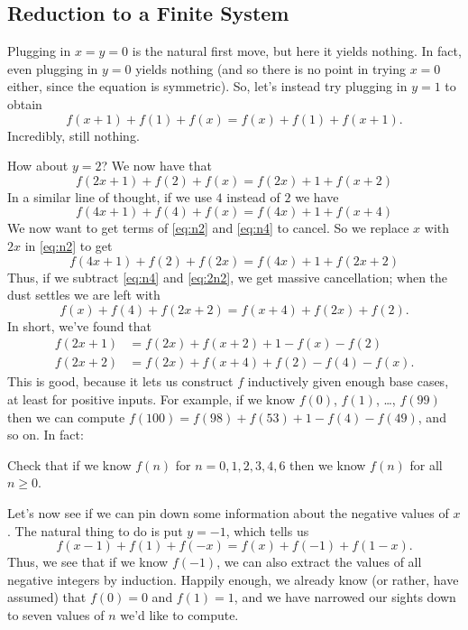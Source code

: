\documentclass[11pt]{scrartcl}
\begin{document}
\subsection{Reduction to a Finite System}
Plugging in $x=y=0$ is the natural first move, but here it yields nothing.
In fact, even plugging in $y=0$ yields nothing
(and so there is no point in trying $x=0$ either, since the equation is symmetric).
So, let's instead try plugging in $y=1$ to obtain
\[ f(x+1) + f(1) + f(x) = f(x) + f(1) + f(x+1). \]
Incredibly, still nothing.

How about $y=2$? We now have that
\begin{equation}
  f(2x+1) + f(2) + f(x) = f(2x) + 1 + f(x+2)
  \label{eq:n2}
\end{equation}
In a similar line of thought, if we use $4$ instead of $2$ we have
\begin{equation}
  f(4x+1) + f(4) + f(x) = f(4x) + 1 + f(x+4)
  \label{eq:n4}
\end{equation}
We now want to get terms of \eqref{eq:n2} and \eqref{eq:n4} to cancel.
So we replace $x$ with $2x$ in \eqref{eq:n2} to get
\begin{equation}
  f(4x+1) + f(2) + f(2x) = f(4x) + 1 + f(2x+2)
  \label{eq:2n2}
\end{equation}
Thus, if we subtract \eqref{eq:n4} and \eqref{eq:2n2}, we get massive cancellation;
when the dust settles we are left with
\[ f(x) + f(4) + f(2x+2) = f(x+4) + f(2x) + f(2). \]
In short, we've found that
\begin{align*}
  f(2x+1) &= f(2x) + f(x+2) + 1 - f(x) - f(2) \\
  f(2x+2) &= f(2x) + f(x+4) + f(2) - f(4) - f(x).
\end{align*}
This is good, because it lets us construct $f$ inductively given enough base cases,
at least for positive inputs.
For example, if we know $f(0)$, $f(1)$, \dots, $f(99)$ then
we can compute $f(100) = f(98)+f(53)+1-f(4)-f(49)$, and so on.
In fact:
\begin{exercise}
  Check that if we know $f(n)$ for $n=0,1,2,3,4,6$ then we know $f(n)$ for all $n \ge 0$.
\end{exercise}

Let's now see if we can pin down some information about the negative values of $x$.
The natural thing to do is put $y=-1$, which tells us
\[ f(x-1) + f(1) + f(-x) = f(x) + f(-1) + f(1-x). \]
Thus, we see that if we know $f(-1)$, we can also extract the values of all
negative integers by induction.
Happily enough, we already know (or rather, have assumed) that $f(0) = 0$ and $f(1) = 1$,
and we have narrowed our sights down to seven values of $n$ we'd like to compute.
\end{document}
